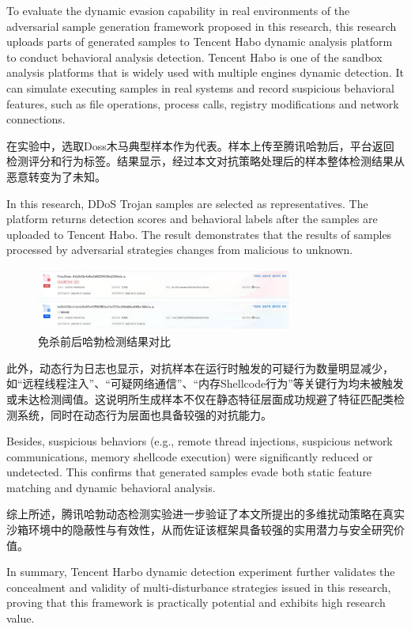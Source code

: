 To evaluate the dynamic evasion capability in real environments of the adversarial sample generation framework proposed in this research, this research uploads parts of generated samples to Tencent Habo dynamic analysis platform to conduct behavioral analysis detection. Tencent Habo is one of the sandbox analysis platforms that is widely used with multiple engines dynamic detection. It can simulate executing samples in real systems and record suspicious behavioral features, such as file operations, process calls, registry modifications and network connections.

在实验中，选取Doss木马典型样本作为代表。样本上传至腾讯哈勃后，平台返回检测评分和行为标签。结果显示，经过本文对抗策略处理后的样本整体检测结果从恶意转变为了未知。

In this research, DDoS Trojan samples are selected as representatives. The platform returns detection scores and behavioral labels after the samples are uploaded to Tencent Habo. The result demonstrates that the results of samples processed by adversarial strategies changes from malicious to unknown.

\begin{figure}[hbt]
	\centering
	\includegraphics[width=0.75\textwidth]{figures/5.2}
	\caption{免杀前后哈勃检测结果对比}\label{fig:5.2}
\end{figure}

此外，动态行为日志也显示，对抗样本在运行时触发的可疑行为数量明显减少，如“远程线程注入”、“可疑网络通信”、“内存Shellcode行为”等关键行为均未被触发或未达检测阈值。这说明所生成样本不仅在静态特征层面成功规避了特征匹配类检测系统，同时在动态行为层面也具备较强的对抗能力。

Besides, suspicious behaviors (e.g., remote thread injections, suspicious network communications, memory shellcode execution) were significantly reduced or undetected.
This confirms that generated samples evade both static feature matching and dynamic behavioral analysis.

综上所述，腾讯哈勃动态检测实验进一步验证了本文所提出的多维扰动策略在真实沙箱环境中的隐蔽性与有效性，从而佐证该框架具备较强的实用潜力与安全研究价值。

In summary, Tencent Harbo dynamic detection experiment further validates the concealment and validity of multi-disturbance strategies issued in this research, proving that this framework is practically potential and exhibits high research value. 

